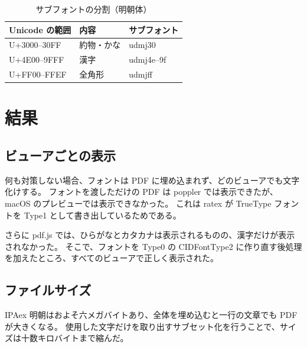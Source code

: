 \documentclass[11pt]{article}
\newcommand{\goth}[1]{{\sffamily #1}}
\begin{document}
\begin{table}[h]
\centering
\begin{tabular}{lll}
\hline
\textbf{Unicode} の範囲 & 内容 & サブフォント \\
\hline
U+3000--30FF & 約物・かな & udmj30 \\
U+4E00--9FFF & 漢字 & udmj4e--9f \\
U+FF00--FFEF & 全角形 & udmjff \\
\hline
\end{tabular}
\caption{サブフォントの分割（明朝体）}
\end{table}

\section{\goth{結果}}
\subsection{\goth{ビューアごとの表示}}
何も対策しない場合、フォントは PDF に埋め込まれず、どのビューアでも文字化けする。
フォントを渡しただけの PDF は poppler では表示できたが、macOS のプレビューでは表示できなかった。
これは ratex が TrueType フォントを Type1 として書き出しているためである。

さらに pdf.js では、ひらがなとカタカナは表示されるものの、漢字だけが表示されなかった。
そこで、フォントを Type0 の CIDFontType2 に作り直す後処理を加えたところ、すべてのビューアで正しく表示された。

\subsection{\goth{ファイルサイズ}}
IPAex 明朝はおよそ六メガバイトあり、全体を埋め込むと一行の文章でも PDF が大きくなる。
使用した文字だけを取り出すサブセット化を行うことで、サイズは十数キロバイトまで縮んだ。
\end{document}
